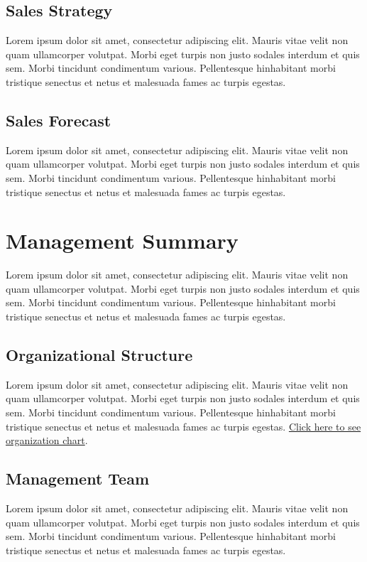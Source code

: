 \documentclass[11pt]{article}
\begin{document}
\subsection{Sales Strategy}
Lorem ipsum dolor sit amet, consectetur adipiscing elit. Mauris vitae velit
non quam ullamcorper volutpat. Morbi eget turpis non justo sodales interdum
et quis sem. Morbi tincidunt condimentum various. Pellentesque hinhabitant morbi
tristique senectus et netus et malesuada fames ac turpis egestas.\newline
\subsection{Sales Forecast}
Lorem ipsum dolor sit amet, consectetur adipiscing elit. Mauris vitae velit
non quam ullamcorper volutpat. Morbi eget turpis non justo sodales interdum
et quis sem. Morbi tincidunt condimentum various. Pellentesque hinhabitant morbi
tristique senectus et netus et malesuada fames ac turpis egestas.\newline
\pagebreak

\section{Management Summary}
Lorem ipsum dolor sit amet, consectetur adipiscing elit. Mauris vitae velit
non quam ullamcorper volutpat. Morbi eget turpis non justo sodales interdum
et quis sem. Morbi tincidunt condimentum various. Pellentesque hinhabitant morbi
tristique senectus et netus et malesuada fames ac turpis egestas.\newline
\subsection{Organizational Structure}
Lorem ipsum dolor sit amet, consectetur adipiscing elit. Mauris vitae velit
non quam ullamcorper volutpat. Morbi eget turpis non justo sodales interdum
et quis sem. Morbi tincidunt condimentum various. Pellentesque hinhabitant morbi
tristique senectus et netus et malesuada fames ac turpis egestas.\newline
\hyperlink{ref_org_chart}{Click here to see organization chart}.
\subsection{Management Team}
Lorem ipsum dolor sit amet, consectetur adipiscing elit. Mauris vitae velit
non quam ullamcorper volutpat. Morbi eget turpis non justo sodales interdum
et quis sem. Morbi tincidunt condimentum various. Pellentesque hinhabitant morbi
tristique senectus et netus et malesuada fames ac turpis egestas.\newline
\end{document}
